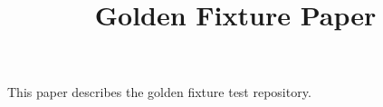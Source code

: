 \documentclass{article}
\title{Golden Fixture Paper}
\begin{document}
\maketitle
This paper describes the golden fixture test repository.
\end{document}
